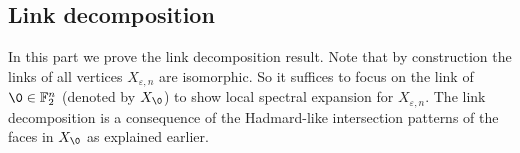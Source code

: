 \documentclass[10pt,a4paper]{article}
\newcommand{\prettyref}[1]{\cref{#1}}
\theoremstyle{definition}
\theoremstyle{remark}
\newcommand{\Authornotecolored}[3]{{\sffamily\small\color{#1}{[#2: #3]}}}
\newcommand{\Authornotecolored}[3]{}
\newcommand{\Ynote}{\Authornotecolored{Purple}{Y}}
\newcommand{\Snote}{\Authornotecolored{Green}{S}}
\newcommand{\snote}{\Snote}
\newcommand{\iprod}[1]{\langle#1\rangle}
\newcommand{\F}{\mathbb{F}}
\renewcommand{\le}{\leqslant}
\numberwithin{equation}{section}
\let\pref=\prettyref
\begin{document}
\subsection{Link decomposition}
In this part we prove the link decomposition result.
%
Note that by construction the links of all vertices $X_{\varepsilon,n}$ are isomorphic. So it suffices to focus on the link of $\0\in \mathbb{F}_2^n$ (denoted by $X_{\0}$) to show local spectral expansion for $X_{\varepsilon,n}$. 
%
The link decomposition is a consequence of the Hadmard-like intersection patterns of the faces in $X_{\0}$ as explained earlier. 
%

\end{document}
